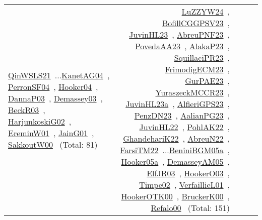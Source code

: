 {\begin{longtable}{p{3cm}r>{\raggedright\arraybackslash}p{6cm}>{\raggedright\arraybackslash}p{6cm}>{\raggedright\arraybackslash}p{8cm}}
\href{../works/QinWSLS21.pdf}{QinWSLS21}~\cite{QinWSLS21}...\href{../works/KanetAG04.pdf}{KanetAG04}~\cite{KanetAG04}, \href{../works/PerronSF04.pdf}{PerronSF04}~\cite{PerronSF04}, \href{../works/Hooker04.pdf}{Hooker04}~\cite{Hooker04}, \href{../works/DannaP03.pdf}{DannaP03}~\cite{DannaP03}, \href{../works/Demassey03.pdf}{Demassey03}~\cite{Demassey03}, \href{../works/BeckR03.pdf}{BeckR03}~\cite{BeckR03}, \href{../works/HarjunkoskiG02.pdf}{HarjunkoskiG02}~\cite{HarjunkoskiG02}, \href{../works/EreminW01.pdf}{EreminW01}~\cite{EreminW01}, \href{../works/JainG01.pdf}{JainG01}~\cite{JainG01}, \href{../works/SakkoutW00.pdf}{SakkoutW00}~\cite{SakkoutW00} (Total: 81) & \href{../works/LuZZYW24.pdf}{LuZZYW24}~\cite{LuZZYW24}, \href{../works/BofillCGGPSV23.pdf}{BofillCGGPSV23}~\cite{BofillCGGPSV23}, \href{../works/JuvinHL23.pdf}{JuvinHL23}~\cite{JuvinHL23}, \href{../works/AbreuPNF23.pdf}{AbreuPNF23}~\cite{AbreuPNF23}, \href{../works/PovedaAA23.pdf}{PovedaAA23}~\cite{PovedaAA23}, \href{../works/AlakaP23.pdf}{AlakaP23}~\cite{AlakaP23}, \href{../works/SquillaciPR23.pdf}{SquillaciPR23}~\cite{SquillaciPR23}, \href{../works/FrimodigECM23.pdf}{FrimodigECM23}~\cite{FrimodigECM23}, \href{../works/GurPAE23.pdf}{GurPAE23}~\cite{GurPAE23}, \href{../works/YuraszeckMCCR23.pdf}{YuraszeckMCCR23}~\cite{YuraszeckMCCR23}, \href{../works/JuvinHL23a.pdf}{JuvinHL23a}~\cite{JuvinHL23a}, \href{../works/AlfieriGPS23.pdf}{AlfieriGPS23}~\cite{AlfieriGPS23}, \href{../works/PenzDN23.pdf}{PenzDN23}~\cite{PenzDN23}, \href{../works/AalianPG23.pdf}{AalianPG23}~\cite{AalianPG23}, \href{../works/JuvinHL22.pdf}{JuvinHL22}~\cite{JuvinHL22}, \href{../works/PohlAK22.pdf}{PohlAK22}~\cite{PohlAK22}, \href{../works/GhandehariK22.pdf}{GhandehariK22}~\cite{GhandehariK22}, \href{../works/AbreuN22.pdf}{AbreuN22}~\cite{AbreuN22}, \href{../works/FarsiTM22.pdf}{FarsiTM22}~\cite{FarsiTM22}...\href{../works/BeniniBGM05a.pdf}{BeniniBGM05a}~\cite{BeniniBGM05a}, \href{../works/Hooker05a.pdf}{Hooker05a}~\cite{Hooker05a}, \href{../works/DemasseyAM05.pdf}{DemasseyAM05}~\cite{DemasseyAM05}, \href{../works/ElfJR03.pdf}{ElfJR03}~\cite{ElfJR03}, \href{../works/HookerO03.pdf}{HookerO03}~\cite{HookerO03}, \href{../works/Timpe02.pdf}{Timpe02}~\cite{Timpe02}, \href{../works/VerfaillieL01.pdf}{VerfaillieL01}~\cite{VerfaillieL01}, \href{../works/HookerOTK00.pdf}{HookerOTK00}~\cite{HookerOTK00}, \href{../works/BruckerK00.pdf}{BruckerK00}~\cite{BruckerK00}, \href{../works/Refalo00.pdf}{Refalo00}~\cite{Refalo00} (Total: 151)\\

\end{longtable}}
